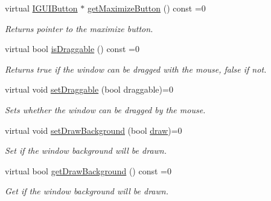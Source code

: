\begin{DoxyCompactItemize}
virtual \hyperlink{classirr_1_1gui_1_1IGUIButton}{I\+G\+U\+I\+Button} $\ast$ \hyperlink{classirr_1_1gui_1_1IGUIWindow_a7b5976907664ed8603f3a603079d3b15}{get\+Maximize\+Button} () const =0
\begin{DoxyCompactList}\small\item\em Returns pointer to the maximize button. \end{DoxyCompactList}\item 
\mbox{\label{classirr_1_1gui_1_1IGUIWindow_a466621df62d0dd97eb008efd3d31d4d9}} 
virtual bool \hyperlink{classirr_1_1gui_1_1IGUIWindow_a466621df62d0dd97eb008efd3d31d4d9}{is\+Draggable} () const =0
\begin{DoxyCompactList}\small\item\em Returns true if the window can be dragged with the mouse, false if not. \end{DoxyCompactList}\item 
\mbox{\label{classirr_1_1gui_1_1IGUIWindow_aeec78bc610444411cafd5925ab7650a7}} 
virtual void \hyperlink{classirr_1_1gui_1_1IGUIWindow_aeec78bc610444411cafd5925ab7650a7}{set\+Draggable} (bool draggable)=0
\begin{DoxyCompactList}\small\item\em Sets whether the window can be dragged by the mouse. \end{DoxyCompactList}\item 
\mbox{\label{classirr_1_1gui_1_1IGUIWindow_a76f7d790554c6bd60b601a64a4127169}} 
virtual void \hyperlink{classirr_1_1gui_1_1IGUIWindow_a76f7d790554c6bd60b601a64a4127169}{set\+Draw\+Background} (bool \hyperlink{classirr_1_1gui_1_1IGUIElement_a1ef7eeaff67b8a9f4f37cacdc7e54be2}{draw})=0
\begin{DoxyCompactList}\small\item\em Set if the window background will be drawn. \end{DoxyCompactList}\item 
\mbox{\label{classirr_1_1gui_1_1IGUIWindow_a6a7720d558220d29125bc494961f4463}} 
virtual bool \hyperlink{classirr_1_1gui_1_1IGUIWindow_a6a7720d558220d29125bc494961f4463}{get\+Draw\+Background} () const =0
\begin{DoxyCompactList}\small\item\em Get if the window background will be drawn. \end{DoxyCompactList}\item 

\end{DoxyCompactItemize}
